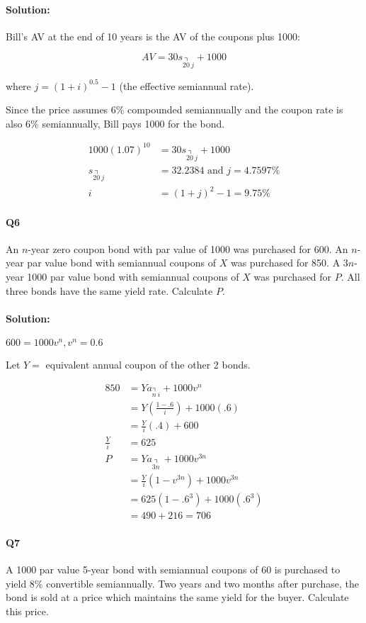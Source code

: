 \documentclass[a4paper, 11pt, twoside]{article}
\begin{document}
\paragraph{Solution:} Bill's AV at the end of 10 years is the AV of the coupons plus 1000:

\[AV = 30s_{\annuity{20\ }j}+1000\]

where $j=(1+i)^{0.5}-1$ (the effective semiannual rate).

Since the price assumes 6\% compounded semiannually and the coupon rate is also 6\% semiannually, Bill pays 1000 for the bond.

\[\begin{split}
	1000(1.07)^{10}&=30s_{\annuity{20\ }j}+1000\\
	s_{\annuity{20\ }j}&=32.2384 \text{ and } j = 4.7597\%\\
	i&=(1+j)^2-1=9.75\%
\end{split}\]

\paragraph{Q6} An $n$-year zero coupon bond with par value of 1000 was purchased for 600. An $n$-year par value bond with semiannual coupons of $X$ was purchased for 850. A $3n$-year 1000 par value bond with semiannual coupons of $X$ was purchased for $P$. All three bonds have the same yield rate. Calculate $P$.

\paragraph{Solution:} $600=1000v^n, v^n=0.6$

Let $Y=$ equivalent annual coupon of the other 2 bonds.

\[
\begin{split}
	850&=Ya_{\annuity{n\ }i}+1000v^n\\
	&=Y\left(\frac{1-.6}{i}\right)+1000(.6)\\
	&=\frac{Y}{i}(.4)+600\\
	\frac{Y}{i}&=625\\
	P&=Ya_{\annuity{3n\ }}+ 1000v^{3n}\\
	&=\frac{Y}{i}(1-v^{3n})+1000v^{3n}\\
	&=625(1-.6^3)+1000(.6^3)\\
	&=490+216=706
	\end{split}
\]

\paragraph{Q7} A 1000 par value 5-year bond with semiannual coupons of 60 is purchased to yield 8\% convertible semiannually. Two years and two months after purchase, the bond is sold at a price which maintains the same yield for the buyer. Calculate this price.
\end{document}
